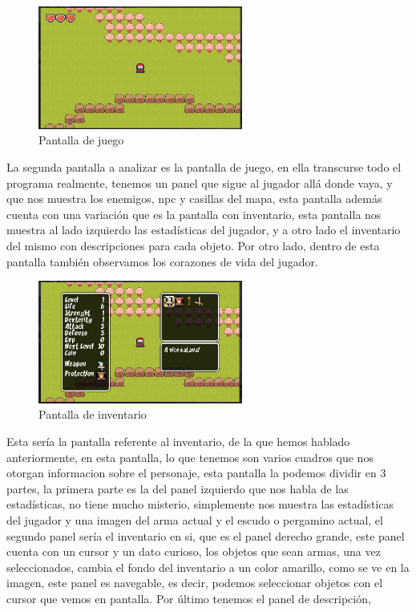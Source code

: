 \documentclass[a4paper]{article}
\begin{document}
\begin{figure}[!ht]
    \centering
    \includegraphics[width=0.6\textwidth]{Images/pantalla2tfg.png}
    \caption{Pantalla de juego}
    \label{fig:pantalla2}
\end{figure}
La segunda pantalla a analizar es la pantalla de juego, en ella transcurse todo el programa realmente, tenemos un panel que sigue al jugador allá donde vaya, y que nos muestra los enemigos, npc y casillas del mapa, esta pantalla además cuenta con una variación que es la pantalla con inventario, esta pantalla nos muestra al lado izquierdo las estadísticas del jugador, y a otro lado el inventario del mismo con descripciones para cada objeto.
Por otro lado, dentro de esta pantalla también observamos los corazones de vida del jugador.\\
\begin{figure}[!ht]
    \centering
    \includegraphics[width=0.6\textwidth]{Images/pantalla3tfg.png}
    \caption{Pantalla de inventario}
    \label{fig:pantalla3}
\end{figure}
Esta sería la pantalla referente al inventario, de la que hemos hablado anteriormente, en esta pantalla, lo que tenemos son varios cuadros que nos otorgan informacion sobre el personaje, esta pantalla la podemos dividir en 3 partes,
la primera parte es la del panel izquierdo que nos habla de las estadísticas, no tiene mucho misterio, simplemente nos muestra las estadísticas del jugador y una imagen del arma actual y el escudo o pergamino actual, el segundo panel sería el inventario en si, que es el panel derecho grande,
este panel cuenta con un cursor y un dato curioso, los objetos que sean armas, una vez seleccionados, cambia el fondo del inventario a un color amarillo, como se ve en la imagen, este panel es navegable, es decir, podemos seleccionar objetos con el cursor que vemos en pantalla. Por último tenemos el panel de descripción,
\end{document}
